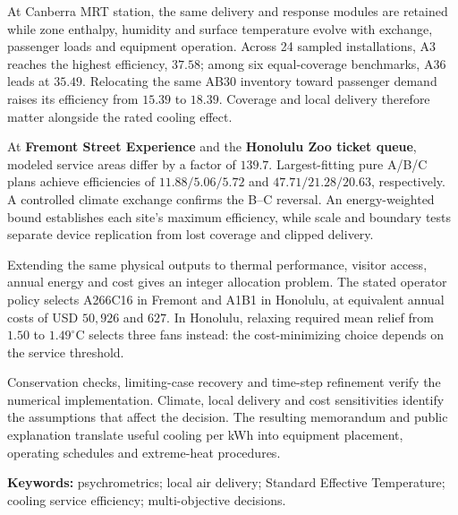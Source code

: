 \documentclass[12pt]{article}
\begin{document}
At Canberra MRT station, the same delivery and response modules are retained while zone enthalpy, humidity and surface temperature evolve with exchange, passenger loads and equipment operation. Across 24 sampled installations, A3 reaches the highest efficiency, $37.58$; among six equal-coverage benchmarks, A36 leads at $35.49$. Relocating the same AB30 inventory toward passenger demand raises its efficiency from $15.39$ to $18.39$. Coverage and local delivery therefore matter alongside the rated cooling effect.

At \textbf{Fremont Street Experience} and the \textbf{Honolulu Zoo ticket queue}, modeled service areas differ by a factor of $139.7$. Largest-fitting pure A/B/C plans achieve efficiencies of $11.88/5.06/5.72$ and $47.71/21.28/20.63$, respectively. A controlled climate exchange confirms the B--C reversal. An energy-weighted bound establishes each site's maximum efficiency, while scale and boundary tests separate device replication from lost coverage and clipped delivery.

Extending the same physical outputs to thermal performance, visitor access, annual energy and cost gives an integer allocation problem. The stated operator policy selects A266C16 in Fremont and A1B1 in Honolulu, at equivalent annual costs of USD $50{,}926$ and $627$. In Honolulu, relaxing required mean relief from $1.50$ to $1.49^\circ$C selects three fans instead: the cost-minimizing choice depends on the service threshold.

Conservation checks, limiting-case recovery and time-step refinement verify the numerical implementation. Climate, local delivery and cost sensitivities identify the assumptions that affect the decision. The resulting memorandum and public explanation translate useful cooling per kWh into equipment placement, operating schedules and extreme-heat procedures.

\noindent\textbf{Keywords:} psychrometrics; local air delivery; Standard Effective Temperature; cooling service efficiency; multi-objective decisions.

\newpage
\pagestyle{fancy}
\setcounter{tocdepth}{1}
\end{document}
